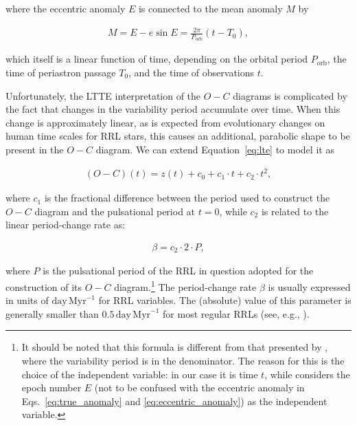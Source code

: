 \documentclass[twocolumn,times]{aastex63}
\begin{document}
\noindent where the eccentric anomaly $E$ is connected to the mean anomaly $M$ by

\begin{eqnarray}
    \label{eq:eccentric_anomaly}
    M = E - e\sin E = \frac{2\pi}{P_\mathrm{orb}} \left(t-T_0\right),
\end{eqnarray}

\noindent which itself is a linear function of time, depending on the orbital period $P_\mathrm{orb}$,
the time of periastron passage $T_0$, and the time of observations $t$.

Unfortunately, the LTTE interpretation of the $O-C$ diagrams is complicated by the fact that changes in the variability
period accumulate over time. When this change is approximately linear, as is expected from evolutionary changes
on human time scales for RRL stars, this causes an additional, parabolic shape to be present in the $O-C$ diagram. We can
extend Equation~\ref{eq:lte} to model it as

\begin{eqnarray}
    \label{eq:parabola}
    (O-C)(t) = z(t) + c_0 + c_1 \cdot t + c_2 \cdot t^2,
\end{eqnarray}

\noindent where $c_1$ is the fractional difference between the period used to construct the $O-C$ diagram and
the pulsational period at $t=0$, while $c_2$ is related to the linear period-change rate \citep{2005ASPC..335....3S} as:

\begin{eqnarray}
    \label{eq:pchange}
    \beta = c_2 \cdot 2 \cdot P,
\end{eqnarray}

\noindent where $P$ is the pulsational period of the RRL in question adopted for the construction of its $O-C$ diagram.\footnote{
It should be noted that this formula is different from that presented by \citet{2005ASPC..335....3S},
where the variability period is in the denominator. The reason for this is the choice of the independent variable:
in our case it is time $t$, while \citet{2005ASPC..335....3S} considers the epoch number $E$ (not to be confused with the eccentric
anomaly in Eqs.~\ref{eq:true_anomaly} and \ref{eq:eccentric_anomaly}) as the independent variable.
}
The period-change rate $\beta$ is usually expressed in units of $\mathrm{day}\,\mathrm{Myr}^{-1}$ for RRL
variables. The (absolute) value of this parameter is generally smaller than $0.5\,\mathrm{day}\,\mathrm{Myr}^{-1}$
for most regular RRLs (see, e.g., \citealt{2001AJ....121..951J,2011MNRAS.411.1744S,2012MNRAS.419.2173J}).
\end{document}
